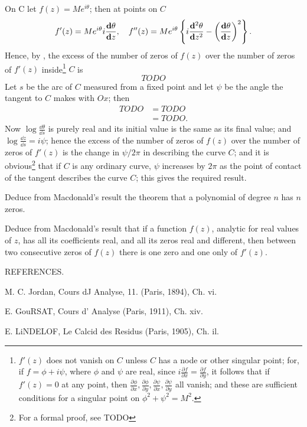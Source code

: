 On C let $f(z) = M e^{i\theta}$; then at points on $C$
$$
f'(z) = M e^{i\theta} i \frac{\mathbf{d} \theta}{\mathbf{d} z},
\quad
f''(z)
=
M e^{i\theta}
\left\{ 
  i \frac{ \mathbf{d}^{2} \theta }{ \mathbf{d} z^{2} }
  -
  \left(  \frac{\mathbf{d} \theta}{\mathbf{d} z}  \right)^{2}
 \right\}.
$$
Hence, by , the excess of the number of zeros
of $f(z)$ over the number of zeros of $f'(z)$
inside\footnote{$f'(z)$ does not vanish on $C$ unless $C$ has a node
  or other singular point; for, if $f = \phi + i\psi$,
  where $\phi$ and $\psi$ are real, since
  $i \frac{\partial f}{\partial x} = \frac{\partial f}{\partial y}$,
  it follows that if $f'(z) = 0$ at any point, then
  $\frac{\partial \phi}{\partial x},
  \frac{\partial \phi}{\partial y},
  \frac{\partial \psi}{\partial x},
  \frac{\partial \psi}{\partial y}$
  all vanish; and these are sufficient conditions for a singular point
  on  $\phi^{2} + \psi^{2} = M^{2}$.
} $C$ is
$$
TODO
$$
Let $s$ be the arc of $C$ measured from a fixed point and let $\psi$
be the angle the tangent to $C$ makes with $Ox$; then
\begin{align*}
  TODO
  &=
  TODO
  \\
  &=
  TODO.
\end{align*}
Now $\log \frac{\dd \theta}{\dd s}$ is purely real and its initial
value is the same as its final value; and
$\log \frac{\dd z}{\dd s} = i \psi$; hence the excess of the number of
zeros of $f(z)$ over the number of zeros of
$f'(z)$ is the change in $\psi/2\pi$ in describing the curve $C$; and it is
obvious\footnote{For a formal proof, see TODO} that if $C$ is any
ordinary curve, $\psi$ increases by $2\pi$ as the point of contact of
the tangent describes the curve $C$; this gives the required result.
\begin{wandwexample}
  Deduce from Macdonald's result the theorem that a
  polynomial of degree $n$ has $n$ zeros.
\end{wandwexample}
\begin{wandwexample}
  Deduce from Macdonald's result that if a function $f(z)$,
  analytic for real values of $z$, has all its coefficients real, and all
  its zeros real and different, then between two consecutive zeros of
  $f(z)$ there is one zero and one only of $f'(z)$.
\end{wandwexample}
REFERENCES.

M. C. Jordan, Cours dJ Analyse, 11. (Paris, 1894), Ch. vi.

E. GouRSAT, Cours d' Analyse (Paris, 1911), Ch. xiv.

E. LiNDELOF, Le Calcid des Residus (Paris, 1905), Ch. il.

